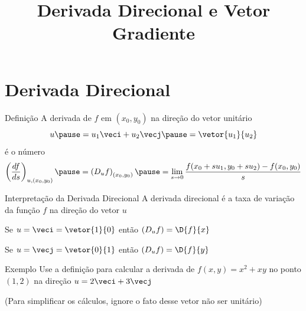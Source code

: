 
\usepackage{calculo_varias_variaveis-1}

\title{Derivada Direcional e Vetor Gradiente}



\addtitle

\section{Derivada Direcional}


\begin{frame}{Definição}
  A derivada de $f$ em $(x_0, y_0)$
  \pause
  na direção do vetor unitário
  \[
    u
    \pause
    = u_1 \veci + u_2 \vecj
    \pause
    = \vetor{u_1}{u_2}
  \]
  \pause
  é o número
  \[
    \left(\frac{df}{ds}\right)_{u, (x_0, y_0)}
    \pause
    = \left(D_u f\right)_{(x_0, y_0)}
    \pause
    = \lim_{s\to 0} \frac{f(x_0+su_1, y_0+su_2)-f(x_0, y_0)}{s}
  \]
\end{frame}


\begin{frame}{Interpretação da Derivada Direcional}
  A derivada direcional é a taxa de variação da função $f$ na direção do vetor $u$

  \pause
  \vspace{\baselineskip}
  Se \(u=\veci=\vetor{1}{0}\)
  \pause
  então
  \(
    \left(D_u f\right) = \D{f}{x}
  \)

  \pause
  \vspace{\baselineskip}
  Se \(u=\vecj=\vetor{0}{1}\)
  \pause
  então
  \(
    \left(D_u f\right) = \D{f}{y}
  \)
\end{frame}

\addtocounter{exemplo}{1}
\begin{frame}{Exemplo \theexemplo}
  Use a definição para calcular a derivada de \(f(x, y) = x^2 + xy\)
  no ponto \((1, 2)\) na direção
  \(
    u = 2\veci + 3\vecj
  \)

  \vspace{2\baselineskip}
  (Para simplificar os cálculos, ignore o fato desse vetor não ser unitário)
\end{frame}

